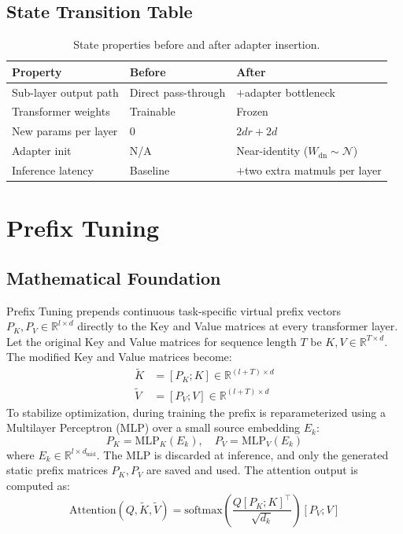 \documentclass{article}
\begin{document}
\subsection{State Transition Table}
\begin{table}[h]\centering
\begin{tabular}{lll}\toprule
\textbf{Property} & \textbf{Before} & \textbf{After}\\\midrule
Sub-layer output path & Direct pass-through & $+$adapter bottleneck\\
Transformer weights & Trainable & Frozen\\
New params per layer & 0 & $2dr + 2d$\\
Adapter init & N/A & Near-identity ($W_{\text{dn}} \sim \mathcal{N}$)\\
Inference latency & Baseline & $+$two extra matmuls per layer\\\bottomrule
\end{tabular}
\caption{State properties before and after adapter insertion.}
\end{table}

\newpage
\section{Prefix Tuning}

\subsection{Mathematical Foundation}
Prefix Tuning prepends continuous task-specific virtual prefix vectors $P_K, P_V \in \mathbb{R}^{l \times d}$ directly to the Key and Value matrices at every transformer layer. Let the original Key and Value matrices for sequence length $T$ be $K, V \in \mathbb{R}^{T \times d}$. The modified Key and Value matrices become:
\begin{align}
  \tilde{K} &= [P_K ; K] \in \mathbb{R}^{(l+T) \times d} \\
  \tilde{V} &= [P_V ; V] \in \mathbb{R}^{(l+T) \times d}
\end{align}
To stabilize optimization, during training the prefix is reparameterized using a Multilayer Perceptron (MLP) over a small source embedding $E_k$:
\begin{equation}
  P_K = \text{MLP}_K(E_k), \quad P_V = \text{MLP}_V(E_k)
\end{equation}
where $E_k \in \mathbb{R}^{l \times d_{\text{mid}}}$. The MLP is discarded at inference, and only the generated static prefix matrices $P_K, P_V$ are saved and used.
The attention output is computed as:
\begin{equation}
  \text{Attention}(Q, \tilde{K}, \tilde{V}) = \text{softmax}\left( \frac{Q [P_K ; K]^\top}{\sqrt{d_k}} \right) [P_V ; V]
\end{equation}
\end{document}
